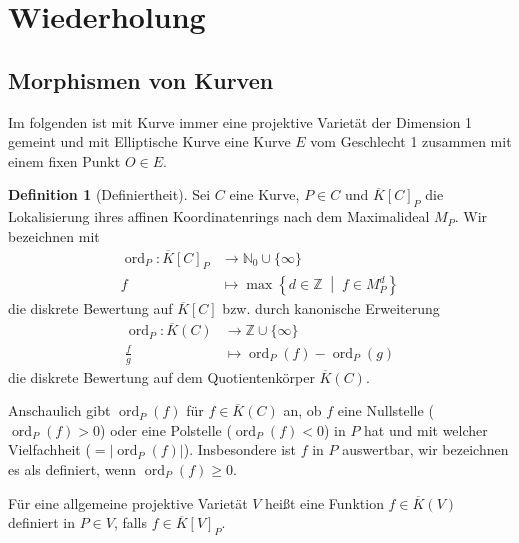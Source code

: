 \documentclass[english, german, parskip=half]{scrartcl}
\theoremstyle{definition}
\newtheorem{Definition}[Satz]{Definition}
\theoremstyle{remark}
\newcommand*{\N}{\mathds{N}}
\newcommand*{\Z}{\mathds{Z}}
\newcommand*{\algK}{\ensuremath{\overline K}} %
\newcommand*{\longto}{\longrightarrow}
\DeclareMathOperator{\ord}{ord} %
\begin{document}
\section{Wiederholung}
\subsection{Morphismen von Kurven}
Im folgenden ist mit Kurve immer eine projektive Varietät der
Dimension 1 gemeint und mit Elliptische Kurve eine Kurve $E$ vom
Geschlecht 1 zusammen mit einem fixen Punkt $O\in E$.

\begin{Definition}[Definiertheit]
  Sei $C$ eine Kurve, $P\in C$ und $\algK[C]_P$ die Lokalisierung
  ihres affinen Koordinatenrings nach dem Maximalideal $M_P$.
  Wir bezeichnen mit
  \begin{align*}
    \ord_P\colon \algK[C]_P &\longto \N_0 \cup \{\infty\} \\
    f &\mapsto \max\left\{d\in\Z\;\middle|\; f\in M_P^d \right\}
  \end{align*}
  die diskrete Bewertung auf $\algK[C]$ bzw. durch kanonische
  Erweiterung
  \begin{align*}
    \ord_P\colon \algK(C) &\longto \Z \cup \{\infty\} \\
    \frac{f}{g} &\longmapsto \ord_P(f) - \ord_P(g)
  \end{align*}
  die diskrete Bewertung auf dem Quotientenkörper $\algK(C)$.

  Anschaulich gibt $\ord_P(f)$ für $f\in\algK(C)$ an, ob $f$
  eine Nullstelle ($\ord_P(f)>0$) oder eine Polstelle ($\ord_P(f)<0$)
  in $P$ hat und mit welcher Vielfachheit ($=|\ord_P(f)|$).
  Insbesondere ist $f$ in $P$ auswertbar, wir bezeichnen es als
  definiert, wenn $\ord_P(f)\geq 0$.

  Für eine allgemeine projektive Varietät $V$ heißt eine Funktion
  $f\in\algK(V)$ definiert in $P\in V$, falls $f\in\algK[V]_P$.
\end{Definition}
\end{document}
